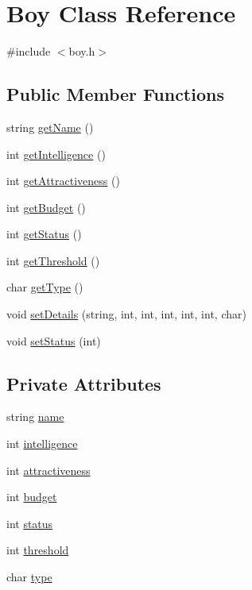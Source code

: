 \hypertarget{classBoy}{}\section{Boy Class Reference}
\label{classBoy}


{\ttfamily \#include $<$boy.\+h$>$}

\subsection*{Public Member Functions}
\begin{DoxyCompactItemize}
\item 
string \hyperlink{classBoy_a53e90a641c928c0849e33eca847e902d}{get\+Name} ()
\item 
int \hyperlink{classBoy_ad52c9e04ab591f3909d2342d6cae0168}{get\+Intelligence} ()
\item 
int \hyperlink{classBoy_a814ef4919f2ac86c6ee70f9698afad3d}{get\+Attractiveness} ()
\item 
int \hyperlink{classBoy_a05c48b12091ebcad44ba86ba88514ac5}{get\+Budget} ()
\item 
int \hyperlink{classBoy_a72ac2c3f82b5dbd6ec97bf46dfd62681}{get\+Status} ()
\item 
int \hyperlink{classBoy_abaf6074b318b18f2b4f64f0798c7a8bf}{get\+Threshold} ()
\item 
char \hyperlink{classBoy_a01accc077c0824f7e28cfe391f7851c7}{get\+Type} ()
\item 
void \hyperlink{classBoy_a6ac70867d517f6b429ce67c8eb2915ed}{set\+Details} (string, int, int, int, int, int, char)
\item 
void \hyperlink{classBoy_a3d29dcc4137fbfc0306cbd7df82781c3}{set\+Status} (int)
\end{DoxyCompactItemize}
\subsection*{Private Attributes}
\begin{DoxyCompactItemize}
\item 
string \hyperlink{classBoy_a8649f275f6428267fad0234866c1ccfa}{name}
\item 
int \hyperlink{classBoy_a10f24ab1e3dbee6fac2a122c76954fa5}{intelligence}
\item 
int \hyperlink{classBoy_a679e59279116986aaae135d8a524bc46}{attractiveness}
\item 
int \hyperlink{classBoy_a3b755250e77f892967872c7eb4c26685}{budget}
\item 
int \hyperlink{classBoy_aa076c375327eee04ff0f8d0f6ab26b7b}{status}
\item 
int \hyperlink{classBoy_a7fd8bfde3cb2e58ad6dccad2a2f3d50d}{threshold}
\item 
char \hyperlink{classBoy_a75a233ee206bbb071167a6a56d5d756b}{type}
\end{DoxyCompactItemize}


